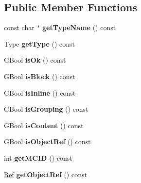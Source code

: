 \subsection*{Public Member Functions}
\begin{DoxyCompactItemize}
\item 
\mbox{\label{class_struct_element_af3757e58eab4064ce0a7c17f3fd1d5d9}} 
const char $\ast$ {\bfseries get\+Type\+Name} () const
\item 
\mbox{\label{class_struct_element_a47554b1c91d5a407dde2b72c5e02e11d}} 
Type {\bfseries get\+Type} () const
\item 
\mbox{\label{class_struct_element_a47c8dde2cf24c762f24e8a0a44c207ed}} 
G\+Bool {\bfseries is\+Ok} () const
\item 
\mbox{\label{class_struct_element_a86ddb8d787ab2bd8850945cebebe2227}} 
G\+Bool {\bfseries is\+Block} () const
\item 
\mbox{\label{class_struct_element_a6a6c8a5bd0321fdaa02b4212e5b131f9}} 
G\+Bool {\bfseries is\+Inline} () const
\item 
\mbox{\label{class_struct_element_ac43103230177fbbe9c55463ec1f98218}} 
G\+Bool {\bfseries is\+Grouping} () const
\item 
\mbox{\label{class_struct_element_a9c4e8ad57ebcd71c64d4919b09f56fb7}} 
G\+Bool {\bfseries is\+Content} () const
\item 
\mbox{\label{class_struct_element_a9debc5e5796e9592d168f4c9d63f938a}} 
G\+Bool {\bfseries is\+Object\+Ref} () const
\item 
\mbox{\label{class_struct_element_a917548a320a3aa077a3ff326f661a3af}} 
int {\bfseries get\+M\+C\+ID} () const
\item 
\mbox{\label{class_struct_element_a49771bcb04f49cc5f9a076c4809c2fc0}} 
\hyperlink{struct_ref}{Ref} {\bfseries get\+Object\+Ref} () const
\item 

\end{DoxyCompactItemize}
